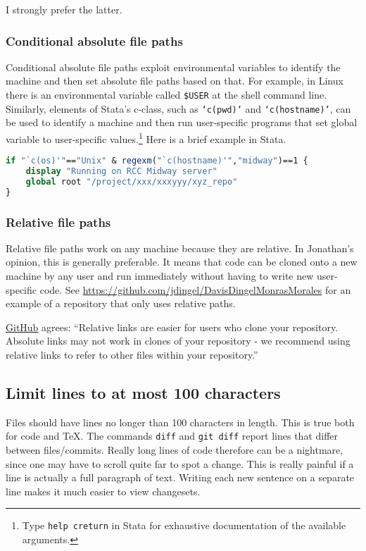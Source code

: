 I strongly prefer the latter.

\subsubsection{Conditional absolute file paths}

Conditional absolute file paths exploit environmental variables to identify the machine and then set absolute file paths based on that.
For example, in Linux there is an environmental variable called \texttt{\$USER} at the shell command line.
Similarly, elements of Stata's c-class, such as \texttt{`c(pwd)'} and \texttt{`c(hostname)'}, can be used to identify a machine 
and then run user-specific programs that set global variable to user-specific values.\footnote{
	Type \texttt{help creturn} in Stata for exhaustive documentation of the available arguments.
}
Here is a brief example in Stata.
\begin{lstlisting}[language=stata]
if "`c(os)'"=="Unix" & regexm("`c(hostname)'","midway")==1 {
	display "Running on RCC Midway server"
	global root "/project/xxx/xxxyyy/xyz_repo"
}
\end{lstlisting}

\subsubsection{Relative file paths}

Relative file paths work on any machine because they are relative.
In Jonathan's opinion, this is generally preferable.
It means that code can be cloned onto a new machine by any user and run immediately without having to write new user-specific code.
See \url{https://github.com/jdingel/DavisDingelMonrasMorales} for an example of a repository that only uses relative paths.

\href{https://help.github.com/articles/about-readmes/\#relative-links-and-image-paths-in-readme-files}{GitHub} agrees:
``Relative links are easier for users who clone your repository. Absolute links may not work in clones of your repository - we recommend using relative links to refer to other files within your repository.''

\subsection{Limit lines to at most 100 characters}

Files should have lines no longer than 100 characters in length.
This is true both for code and \TeX.
The commands \texttt{diff} and \texttt{git diff} report lines that differ between files/commits.
Really long lines of code therefore can be a nightmare, since one may have to scroll quite far to spot a change.
This is really painful if a line is actually a full paragraph of text.
Writing each new sentence on a separate line makes it much easier to view changesets.

